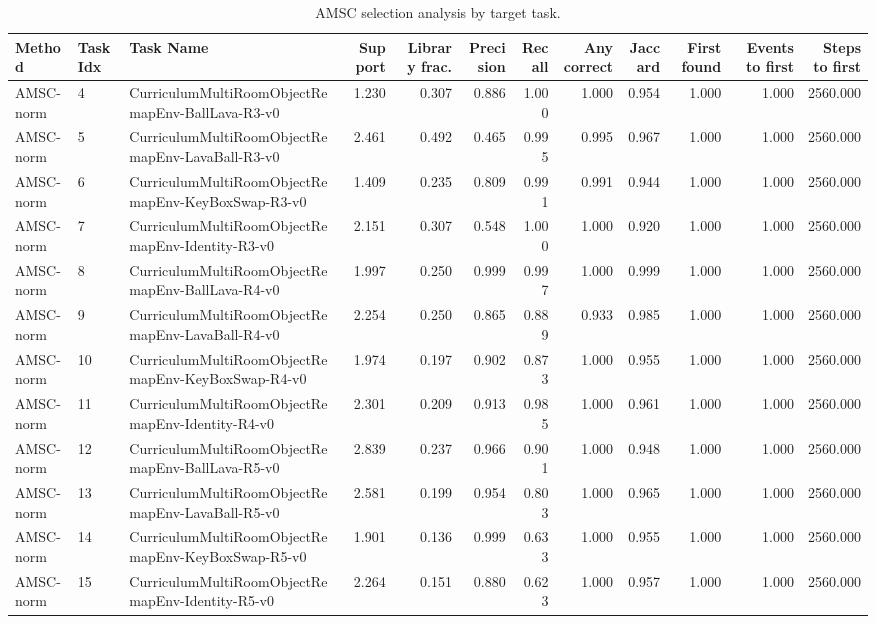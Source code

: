 \begin{table}[ht]
    \caption{AMSC selection analysis by target task.}
    \label{tbl:amsc_selection_task}
    \centering
    \scriptsize
    \begin{tabular}{lllrrrrrrrrr}
    \toprule
Method & Task Idx & Task Name & Support & Library frac. & Precision & Recall & Any correct & Jaccard & First found & Events to first & Steps to first \\
    \midrule
AMSC-norm & 4 & CurriculumMultiRoomObjectRemapEnv-BallLava-R3-v0 & 1.230 & 0.307 & 0.886 & 1.000 & 1.000 & 0.954 & 1.000 & 1.000 & 2560.000 \\
AMSC-norm & 5 & CurriculumMultiRoomObjectRemapEnv-LavaBall-R3-v0 & 2.461 & 0.492 & 0.465 & 0.995 & 0.995 & 0.967 & 1.000 & 1.000 & 2560.000 \\
AMSC-norm & 6 & CurriculumMultiRoomObjectRemapEnv-KeyBoxSwap-R3-v0 & 1.409 & 0.235 & 0.809 & 0.991 & 0.991 & 0.944 & 1.000 & 1.000 & 2560.000 \\
AMSC-norm & 7 & CurriculumMultiRoomObjectRemapEnv-Identity-R3-v0 & 2.151 & 0.307 & 0.548 & 1.000 & 1.000 & 0.920 & 1.000 & 1.000 & 2560.000 \\
AMSC-norm & 8 & CurriculumMultiRoomObjectRemapEnv-BallLava-R4-v0 & 1.997 & 0.250 & 0.999 & 0.997 & 1.000 & 0.999 & 1.000 & 1.000 & 2560.000 \\
AMSC-norm & 9 & CurriculumMultiRoomObjectRemapEnv-LavaBall-R4-v0 & 2.254 & 0.250 & 0.865 & 0.889 & 0.933 & 0.985 & 1.000 & 1.000 & 2560.000 \\
AMSC-norm & 10 & CurriculumMultiRoomObjectRemapEnv-KeyBoxSwap-R4-v0 & 1.974 & 0.197 & 0.902 & 0.873 & 1.000 & 0.955 & 1.000 & 1.000 & 2560.000 \\
AMSC-norm & 11 & CurriculumMultiRoomObjectRemapEnv-Identity-R4-v0 & 2.301 & 0.209 & 0.913 & 0.985 & 1.000 & 0.961 & 1.000 & 1.000 & 2560.000 \\
AMSC-norm & 12 & CurriculumMultiRoomObjectRemapEnv-BallLava-R5-v0 & 2.839 & 0.237 & 0.966 & 0.901 & 1.000 & 0.948 & 1.000 & 1.000 & 2560.000 \\
AMSC-norm & 13 & CurriculumMultiRoomObjectRemapEnv-LavaBall-R5-v0 & 2.581 & 0.199 & 0.954 & 0.803 & 1.000 & 0.965 & 1.000 & 1.000 & 2560.000 \\
AMSC-norm & 14 & CurriculumMultiRoomObjectRemapEnv-KeyBoxSwap-R5-v0 & 1.901 & 0.136 & 0.999 & 0.633 & 1.000 & 0.955 & 1.000 & 1.000 & 2560.000 \\
AMSC-norm & 15 & CurriculumMultiRoomObjectRemapEnv-Identity-R5-v0 & 2.264 & 0.151 & 0.880 & 0.623 & 1.000 & 0.957 & 1.000 & 1.000 & 2560.000 \\
    \bottomrule
    \end{tabular}
\end{table}
